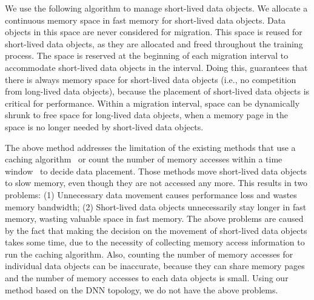 We use the following algorithm to manage short-lived data objects. We allocate a continuous memory space in fast memory for short-lived data objects. Data objects in this space are never considered for migration. This space is reused for short-lived data objects, as they are allocated and freed 
throughout the training process. The space is %
\textcolor{dong2}{reserved} at the beginning of each migration interval to accommodate short-lived data objects in the interval. Doing this, \name guarantees that there is always memory space for short-lived data objects (i.e., no competition from long-lived data objects), because the placement of short-lived data objects is critical for performance. 
Within a migration interval, space can be dynamically shrunk to free space for long-lived data objects, when a memory page in the space %
\textcolor{dong2}{is no longer needed by short-lived data objects.}


The above method addresses the limitation of the existing methods that use a caching algorithm~\cite{Ramos:ics11, RAMinate:socc16, 5260554, Yan:ASPLOS19, heteros:isca17} or count the number of memory accesses within a time window~\cite{Thermostat:asplos17, unimem:sc17}  \textcolor{check}{to decide data placement}. Those methods move short-lived data objects to slow memory, even though they are not accessed any more. This results in two problems: (1) Unnecessary data movement causes performance loss and wastes memory bandwidth; (2) Short-lived data objects unnecessarily stay longer in fast memory, wasting valuable space in fast memory. The above problems are caused by the fact that making the decision on the movement of short-lived data objects takes some time, due to the necessity of collecting memory access information to run the caching algorithm. Also, counting the number of memory accesses for individual data objects can be inaccurate, because they can share memory pages and the number of memory accesses to each data objects is small. \textcolor{check}{Using our method based on the DNN topology, we do not have the above problems.} 


